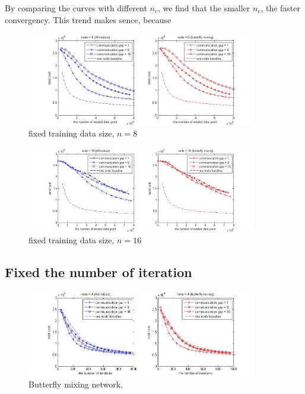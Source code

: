 \documentclass{article}
\begin{document}
By comparing the curves with different $n_c$, we find that the smaller $n_c$, the faster convergency. This trend makes sence, because 
\begin{figure}
  
  \centering
    \includegraphics[width=0.9\textwidth]{batch20_node8_fixData.jpg}
    \caption{fixed training data size, $n=8$}
\end{figure}
\begin{figure}
  
  \centering
    \includegraphics[width=0.9\textwidth]{batch20_node16_fixData.jpg}
    \caption{fixed training data size, $n=16$}
\end{figure}


\subsection{Fixed the number of iteration}
\begin{figure}
  
  \centering
    \includegraphics[width=0.9\textwidth]{batch20_node4_fixIter.jpg}
    \caption{Butterfly mixing network.}
\end{figure}
\end{document}
